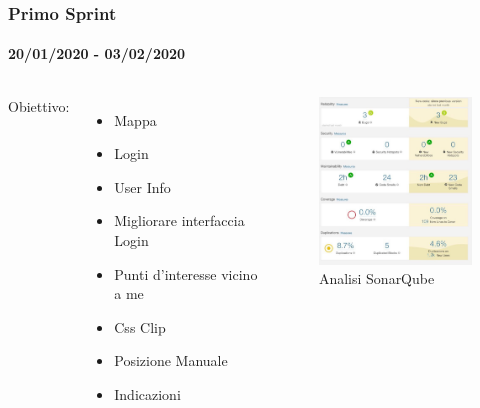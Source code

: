 \documentclass{beamer}
\begin{document}
\begin{frame}
\frametitle{Primo Sprint}
\framesubtitle{20/01/2020 - 03/02/2020}
\begin{columns}
Obiettivo: 
  \begin{itemize}
	\item Mappa
	\item Login
	\item User Info
	\item Migliorare interfaccia Login
	\item Punti d'interesse vicino a me
	\item Css Clip
	\item Posizione Manuale
	\item Indicazioni
  \end{itemize}
  \centering  
  \begin{figure}[h]
        \includegraphics[width=5cm]{Images/SonarQube/primo-sprint.png}
        \caption{Analisi SonarQube}
   \end{figure}
\end{columns}
\end{frame}
\end{document}

